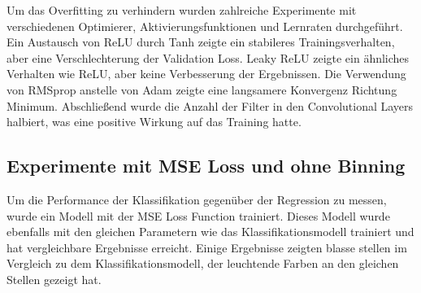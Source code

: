 Um das Overfitting zu verhindern wurden zahlreiche Experimente mit verschiedenen Optimierer, Aktivierungsfunktionen und Lernraten durchgeführt.
Ein Austausch von ReLU durch Tanh zeigte ein stabileres Trainingsverhalten, aber eine Verschlechterung der Validation Loss. Leaky ReLU zeigte 
ein ähnliches Verhalten wie ReLU, aber keine Verbesserung der Ergebnissen. Die Verwendung von RMSprop anstelle von Adam zeigte eine langsamere Konvergenz Richtung Minimum.
Abschließend wurde die Anzahl der Filter in den Convolutional Layers halbiert, was eine positive Wirkung auf das Training hatte.   

\subsection{Experimente mit MSE Loss und ohne Binning}
Um die Performance der Klassifikation gegenüber der Regression zu messen, wurde ein Modell mit der MSE Loss Function trainiert. Dieses Modell
wurde ebenfalls mit den gleichen Parametern wie das Klassifikationsmodell trainiert und hat vergleichbare Ergebnisse erreicht. Einige Ergebnisse
zeigten blasse stellen im Vergleich zu dem Klassifikationsmodell, der leuchtende Farben an den gleichen Stellen gezeigt hat.

